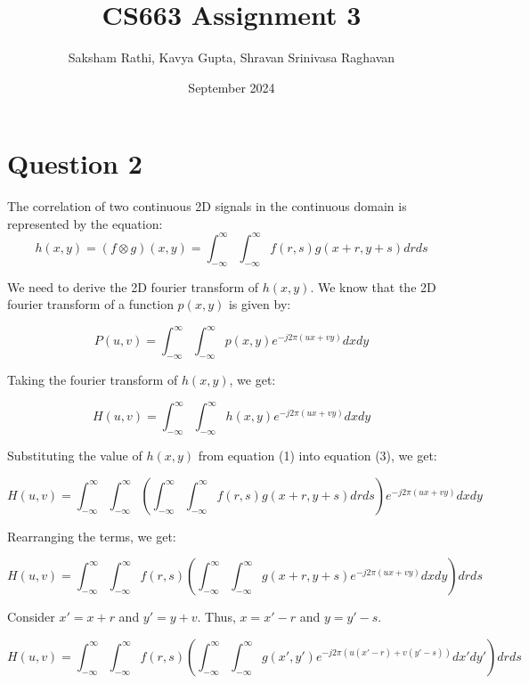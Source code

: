 \documentclass[12pt]{article}
\title{{\bf CS663 Assignment 3}}
\author{Saksham Rathi, Kavya Gupta, Shravan Srinivasa Raghavan}
\date{September 2024}
\begin{document}
\maketitle
\clearpage
\section*{Question 2}
The correlation of two continuous 2D signals in the continuous domain is represented by the equation:
\begin{equation}
    h(x, y) = (f \otimes g)(x, y) = \int_{-\infty}^{\infty} \int_{-\infty}^{\infty} f(r, s)g(x+r, y+s) dr ds
\end{equation}

We need to derive the 2D fourier transform of $h(x, y)$. We know that the 2D fourier transform of a function $p(x, y)$ is given by: 

\begin{equation}
    P(u, v) = \int_{-\infty}^{\infty} \int_{-\infty}^{\infty} p(x, y) e^{-j2\pi(ux+vy)} dx dy
\end{equation}

Taking the fourier transform of $h(x, y)$, we get:

\begin{equation}
    H(u, v) = \int_{-\infty}^{\infty} \int_{-\infty}^{\infty} h(x, y) e^{-j2\pi(ux+vy)} dx dy
\end{equation}

Substituting the value of $h(x, y)$ from equation (1) into equation (3), we get:

\begin{equation}
    H(u, v) = \int_{-\infty}^{\infty} \int_{-\infty}^{\infty} \left( \int_{-\infty}^{\infty} \int_{-\infty}^{\infty} f(r, s)g(x+r, y+s) dr ds \right) e^{-j2\pi(ux+vy)} dx dy
\end{equation}

Rearranging the terms, we get:

\begin{equation}
    H(u, v) = \int_{-\infty}^{\infty} \int_{-\infty}^{\infty} f(r, s) \left( \int_{-\infty}^{\infty} \int_{-\infty}^{\infty} g(x+r, y+s) e^{-j2\pi(ux+vy)} dx dy \right) dr ds
\end{equation}


Consider $x' = x + r$ and $y' = y + v$. Thus, $x = x' - r$ and $y = y' - s$.

\begin{equation}
    H(u, v) = \int_{-\infty}^{\infty} \int_{-\infty}^{\infty} f(r, s) \left( \int_{-\infty}^{\infty} \int_{-\infty}^{\infty} g(x', y') e^{-j2\pi(u(x'-r)+v(y'-s))} dx' dy' \right) dr ds
\end{equation}
\end{document}

